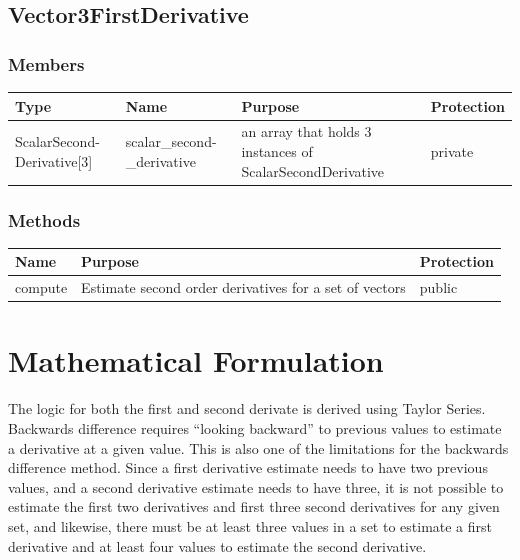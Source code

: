 \documentclass{report}
\begin{document}
\subsection{Vector3FirstDerivative}
\subsubsection{Members}
\begin{center}
\begin{longtable}{|p{2.75cm}|p{2.8cm}|p{7.1cm}|l|} \hline
\textbf{Type} & \textbf{Name} & \textbf{Purpose} & \textbf{Protection} \\
\hline
\endhead
ScalarSecond-\newline Derivative[3] & scalar\_second-\newline\_derivative & an array that holds 3 instances of ScalarSecondDerivative & private \\ 
\hline
\end{longtable}
\end{center}

\subsubsection{Methods}
\begin{center}
\begin{longtable}{|p{3cm}|p{10cm}|l|} \hline
\textbf{Name} & \textbf{Purpose} & \textbf{Protection} \\
\hline
\endhead
compute & Estimate second order derivatives for a set of vectors & public \\
\hline    
\end{longtable}
\end{center}

\section{Mathematical Formulation}
The logic for both the first and second derivate is derived using Taylor Series. Backwards difference requires ``looking backward'' to previous values to estimate a derivative at a given value.
This is also one of the limitations for the backwards difference method. Since a first derivative estimate needs to have two previous values, and a second derivative estimate needs to have three,
it is not possible to estimate the first two derivatives and first three second derivatives for any given set, and likewise, there must be at least three values in a set to estimate a first derivative
and at least four values to estimate the second derivative.
\end{document}
